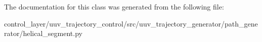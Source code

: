 The documentation for this class was generated from the following file\+:\begin{DoxyCompactItemize}
\item 
control\+\_\+layer/uuv\+\_\+trajectory\+\_\+control/src/uuv\+\_\+trajectory\+\_\+generator/path\+\_\+generator/helical\+\_\+segment.\+py\end{DoxyCompactItemize}
